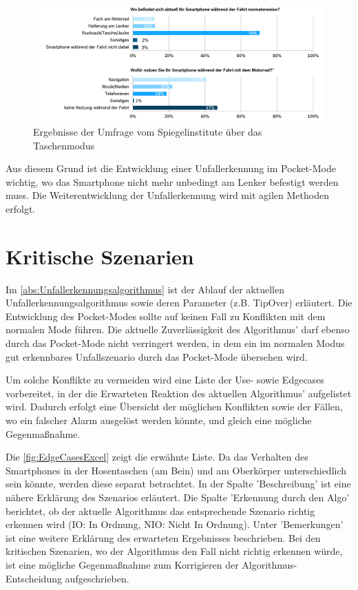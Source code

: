 

\begin{figure}[H]
	\centering
	\includegraphics[width=\linewidth]{Bilder/SpiegelUmfragePocketMode.png}
	\caption{Ergebnisse der Umfrage vom Spiegelinstitute über das Taschenmodus}
	\label{fig:CalimotoUmfragePocketMode}
\end{figure}

Aus diesem Grund ist die Entwicklung einer Unfallerkennung im Pocket-Mode wichtig, wo das Smartphone nicht mehr unbedingt am Lenker befestigt werden muss. Die Weiterentwicklung der Unfallerkennung wird mit agilen Methoden erfolgt.

\section{Kritische Szenarien}
Im \autoref{abs:Unfallerkennungsalgorithmus} ist der Ablauf der aktuellen Unfallerkennungsalgorithmus sowie deren Parameter (z.B. TipOver) erläutert. Die Entwicklung des Pocket-Modes sollte auf keinen Fall zu Konflikten mit dem normalen Mode führen. Die aktuelle Zuverlässigkeit des Algorithmus' darf ebenso durch das Pocket-Mode nicht verringert werden, in dem ein im normalen Modus gut erkennbares Unfallszenario durch das Pocket-Mode übersehen wird.

Um solche Konflikte zu vermeiden wird eine Liste der Use- sowie Edgecases vorbereitet, in der die Erwarteten Reaktion des aktuellen Algorithmus' aufgelistet wird. Dadurch erfolgt eine Übersicht der möglichen Konflikten sowie der Fällen, wo ein falscher Alarm ausgelöst werden könnte, und gleich eine mögliche Gegenmaßnahme.

Die \autoref{fig:EdgeCasesExcel} zeigt die erwähnte Liste. Da das Verhalten des Smartphones in der Hosentaschen (am Bein) und am Oberkörper unterschiedlich sein könnte, werden diese separat betrachtet. In der Spalte 'Beschreibung' ist eine nähere Erklärung des Szenarios erläutert. Die Spalte 'Erkennung durch den Algo' berichtet, ob der aktuelle Algorithmus das entsprechende Szenario richtig erkennen wird (IO: In Ordnung, NIO: Nicht In Ordnung). Unter 'Bemerkungen' ist eine weitere Erklärung des erwarteten Ergebnisses beschrieben. Bei den kritischen Szenarien, wo der Algorithmus den Fall nicht richtig erkennen würde, ist eine mögliche Gegenmaßnahme zum Korrigieren der Algorithmus-Entscheidung aufgeschrieben.

